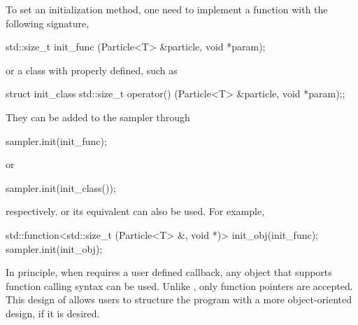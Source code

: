 \documentclass[11pt, fontset=Minion, showoverfull,
bib, mintcode, minted=cache]{marticle}
\begin{document}
To set an initialization method, one need to implement a function with the
following signature,
\begin{cppcode}
std::size_t init_func (Particle<T> &particle, void *param);
\end{cppcode}
or a class with  properly defined, such as
\begin{cppcode}
struct init_class
{std::size_t operator() (Particle<T> &particle, void *param);};
\end{cppcode}
They can be added to the sampler through
\begin{cppcode}
sampler.init(init_func);
\end{cppcode}
or
\begin{cppcode}
sampler.init(init_class());
\end{cppcode}
respectively. \cppoo {} or its \lboost equivalent
 can also be used. For example,
\begin{cppcode}
std::function<std::size_t (Particle<T> &, void *)> init_obj(init_func);
sampler.init(init_obj);
\end{cppcode}
In principle, when \vsmc requires a user defined callback, any object that
supports function calling syntax can be used. Unlike \lsmctc, only function
pointers are accepted. This design of \vsmc allows users to structure the
program with a more object-oriented design, if it is desired.
\end{document}
